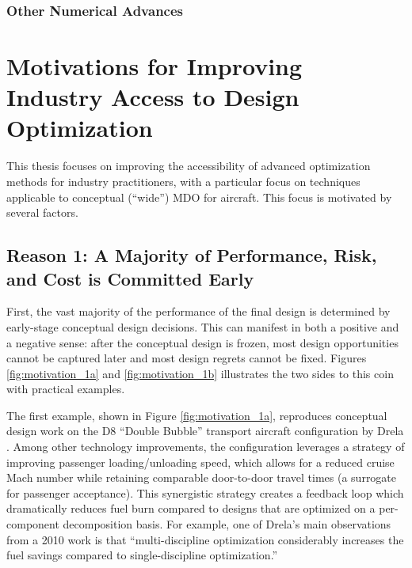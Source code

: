 \documentclass[12pt,vi,oneside]{report}
\begin{document}
    \subsubsection{Other Numerical Advances}

    \afterpage{\FloatBarrier}


    \section{Motivations for Improving Industry Access to Design Optimization}

    This thesis focuses on improving the accessibility of advanced optimization methods for industry practitioners, with a particular focus on techniques applicable to conceptual (``wide'') MDO for aircraft. This focus is motivated by several factors.

    \subsection*{Reason 1: A Majority of Performance, Risk, and Cost is Committed Early}

    First, the vast majority of the performance of the final design is determined by early-stage conceptual design decisions. This can manifest in both a positive and a negative sense: after the conceptual design is frozen, most design opportunities cannot be captured later and most design regrets cannot be fixed. Figures \ref{fig:motivation_1a} and \ref{fig:motivation_1b} illustrates the two sides to this coin with practical examples.

    The first example, shown in Figure \ref{fig:motivation_1a}, reproduces conceptual design work on the D8 ``Double Bubble'' transport aircraft configuration by Drela \cite{drela_development_2011, drela_simultaneous_2010}. Among other technology improvements, the configuration leverages a strategy of improving passenger loading/unloading speed, which allows for a reduced cruise Mach number while retaining comparable door-to-door travel times (a surrogate for passenger acceptance). This synergistic strategy creates a feedback loop which dramatically reduces fuel burn compared to designs that are optimized on a per-component decomposition basis. For example, one of Drela's main observations from a 2010 work \cite{drela_simultaneous_2010} is that ``multi-discipline optimization considerably increases the fuel savings compared to single-discipline optimization.''
\end{document}
